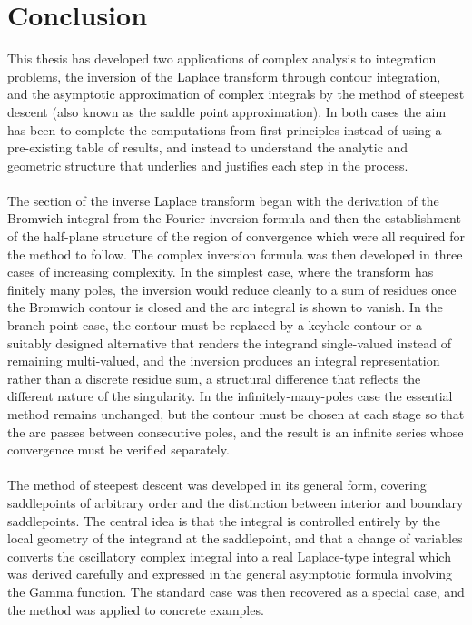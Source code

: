 \chapter{Conclusion}
This thesis has developed two applications of complex analysis to integration problems, the inversion of the Laplace transform through contour integration, and the asymptotic approximation of complex integrals by the method of steepest descent (also known as the saddle point approximation). In both cases the aim has been to complete the computations from first principles instead of using a pre-existing table of results, and instead to understand the analytic and geometric structure that underlies and justifies each step in the process.
\\
\\
The section of the inverse Laplace transform began with the derivation of the Bromwich integral from the Fourier inversion formula and then the establishment of the half-plane structure of the region of convergence which were all required for the method to follow. The complex inversion formula was then developed in three cases of increasing complexity. In the simplest case, where the transform has finitely many poles, the inversion would reduce cleanly to a sum of residues once the Bromwich contour is closed and the arc integral is shown to vanish. In the branch point case, the contour must be replaced by a keyhole contour or a suitably designed alternative that renders the integrand single-valued instead of remaining multi-valued, and the inversion produces an integral representation rather than a discrete residue sum, a structural difference that reflects the different nature of the singularity. In the infinitely-many-poles case the essential method remains unchanged, but the contour must be chosen at each stage so that the arc passes between consecutive poles, and the result is an infinite series whose convergence must be verified separately.
\\
\\
The method of steepest descent was developed in its general form, covering saddlepoints of arbitrary order and the distinction between interior and boundary saddlepoints. The central idea is that the integral is controlled entirely by the local geometry of the integrand at the saddlepoint, and that a change of variables converts the oscillatory complex integral into a real Laplace-type integral which was derived carefully and expressed in the general asymptotic formula involving the Gamma function. The standard case was then recovered as a special case, and the method was applied to concrete examples.
